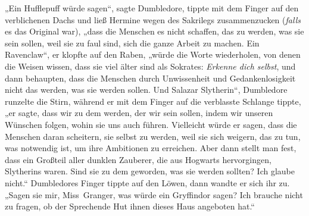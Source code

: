 „Ein Hufflepuff würde sagen“, sagte Dumbledore, tippte mit dem Finger auf den verblichenen Dachs und ließ Hermine wegen des Sakrilegs zusammenzucken (\emph{falls} es das Original war), „dass die Menschen es nicht schaffen, das zu werden, was sie sein sollen, weil sie zu faul sind, sich die ganze Arbeit zu machen. Ein Ravenclaw“, er klopfte auf den Raben, „würde die Worte wiederholen, von denen die Weisen wissen, dass sie viel älter sind als Sokrates: \emph{Erkenne dich selbst}, und dann behaupten, dass die Menschen durch Unwissenheit und Gedankenlosigkeit nicht das werden, was sie werden sollen. Und Salazar Slytherin“, Dumbledore runzelte die Stirn, während er mit dem Finger auf die verblasste Schlange tippte, „er sagte, dass wir zu dem werden, der wir sein sollen, indem wir unseren Wünschen folgen, wohin sie uns auch führen. Vielleicht würde er sagen, dass die Menschen daran scheitern, sie selbst zu werden, weil sie sich weigern, das zu tun, was notwendig ist, um ihre Ambitionen zu erreichen. Aber dann stellt man fest, dass ein Großteil aller dunklen Zauberer, die aus Hogwarts hervorgingen, Slytherins waren. Sind sie zu dem geworden, was sie werden sollten? Ich glaube nicht.“ Dumbledores Finger tippte auf den Löwen, dann wandte er sich ihr zu.
„Sagen sie mir, Miss~Granger, was würde ein Gryffindor sagen? Ich brauche nicht zu fragen, ob der Sprechende Hut ihnen dieses Haus angeboten hat.“

